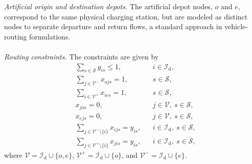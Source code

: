 \documentclass[pdflatex,sn-mathphys-num]{sn-jnl}%
\theoremstyle{thmstyleone}%
\theoremstyle{thmstyletwo}%
\theoremstyle{thmstylethree}%
\begin{document}
\noindent \textit{Artificial origin and destination depots.}
The artificial depot nodes, $o$ and $e$, correspond to the same physical charging station, but  are modeled as distinct nodes to separate departure and return flows, a standard approach in vehicle-routing formulations.\\
\\
\noindent \textit{Routing constraints.}
The constraints are given by
\begin{align}
& \sum_{s \in \mathcal{S}} y_{is} \le 1,
&& i \in \mathcal{I}_{\mathrm{d}},
\label{eq:top_unique_visit}
\\
& \sum_{j \in \mathcal{V}^{-}} x_{ojs} = 1,
&& s \in \mathcal{S},
\label{eq:top_start}
\\
& \sum_{i \in \mathcal{V}^{+}} x_{ies} = 1,
&& s \in \mathcal{S},
\label{eq:top_end}
\\
& x_{jos}=0,
&& j \in \mathcal{V},\ s \in \mathcal{S},
\label{eq:top_no_enter_origin}
\\
& x_{ejs}=0,
&& j \in \mathcal{V},\ s \in \mathcal{S},
\label{eq:top_no_leave_dest}
\\
& \sum_{j \in \mathcal{V}^{-}\setminus\{i\}} x_{ijs}
=
y_{is},
&& i \in \mathcal{I}_{\mathrm{d}},\ s \in \mathcal{S},
\label{eq:top_outflow}
\\
& \sum_{j \in \mathcal{V}^{+}\setminus\{i\}} x_{jis}
=
y_{is},
&& i \in \mathcal{I}_{\mathrm{d}},\ s \in \mathcal{S},
\label{eq:top_inflow}
\end{align}
where $\mathcal{V}=\mathcal{I}_{\mathrm{d}}\cup\{o,e\}$, $\mathcal{V}^{+}=\mathcal{I}_{\mathrm{d}}\cup\{o\}$, and $\mathcal{V}^{-}=\mathcal{I}_{\mathrm{d}}\cup\{e\}$.
\end{document}
